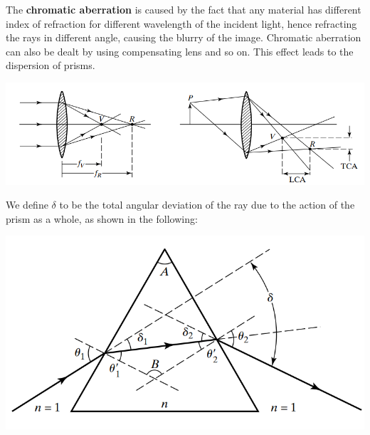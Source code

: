 \documentclass[11pt]{book}
\theoremstyle{break}
\theoremstyle{break}
\begin{document}
The \textbf{chromatic aberration} is caused by the fact that any material has different index of refraction for different wavelength of the incident light, hence refracting the rays in different angle, causing the blurry of the image. Chromatic aberration can also be dealt by using compensating lens and so on. This effect leads to the dispersion of prisms.
\begin{center}
\includegraphics[scale=0.58]{chroAberr.png}
\end{center}

\hfill\break\hfill\break

We define $\delta$ to be the total angular deviation of the ray due to the action of the prism as a whole, as shown in the following:
\begin{center}
\includegraphics[scale=0.45]{prism.png}
\end{center}
\end{document}
